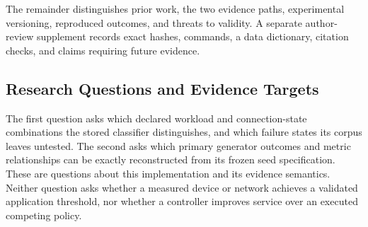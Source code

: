 The remainder distinguishes prior work, the two evidence paths, experimental versioning, reproduced outcomes, and threats to validity. A separate author-review supplement records exact hashes, commands, a data dictionary, citation checks, and claims requiring future evidence.

\subsection{Research Questions and Evidence Targets}
The first question asks which declared workload and connection-state combinations the stored classifier distinguishes, and which failure states its corpus leaves untested. The second asks which primary generator outcomes and metric relationships can be exactly reconstructed from its frozen seed specification. These are questions about this implementation and its evidence semantics. Neither question asks whether a measured device or network achieves a validated application threshold, nor whether a controller improves service over an executed competing policy.
